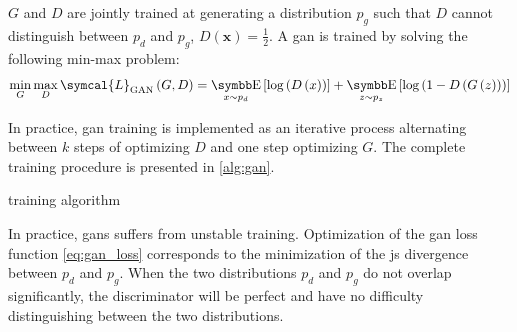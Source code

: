 \documentclass[../main.tex]{subfiles}
\begin{document}
		\(G\) and \(D\) are jointly trained at generating a distribution \(p_{g}\) such that \(D\) cannot distinguish between \(p_{d}\) and \(p_{g}\), \ie{}\(D\left(\symbf{x}\right) = \tfrac12\).
		A \gls{gan} is trained by solving the following min-max problem:
		\begin{equation}
			\min_{G} \max_{D} \symcal{L}_{\text{GAN}}\left(G,D\right) = \E_{x\sim p_{d}}\left[ \log\left(D\left(x\right)\right)\right] + \E_{z\sim p_{z}}\left[ \log\left( 1 - D\left(G\left(z\right)\right)\right)\right] \label{eq:gan_loss}
		\end{equation}

		In practice, \gls{gan} training is implemented as an iterative process alternating between \(k\) steps of optimizing \(D\) and one step optimizing \(G\).
		The complete training procedure is presented in \cref{alg:gan}.
		\begin{algorithm}[htbp]
			\DontPrintSemicolon
			\caption{ training algorithm}\label{alg:gan}
		\end{algorithm}
		In practice, \glspl{gan} suffers from unstable training.
		Optimization of the \gls{gan} loss function \cref{eq:gan_loss} corresponds to the minimization of the \gls{js} divergence between \(p_{d}\) and \(p_{g}\).
		When the two distributions \(p_d\) and \(p_g\) do not overlap significantly, the discriminator will be perfect and have no difficulty distinguishing between the two distributions.
\end{document}
